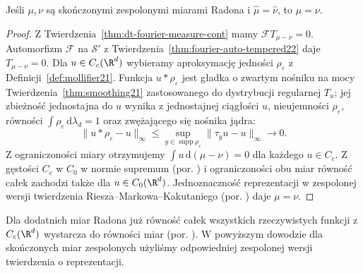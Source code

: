 \begin{twierdzenie}
\label{thm:dt-fourier-measure-unique}
Jeśli $\mu,\nu$ są skończonymi zespolonymi miarami Radona
i $\widehat\mu=\widehat\nu$, to $\mu=\nu$.
\end{twierdzenie}
\begin{proof}
Z Twierdzenia~\ref{thm:dt-fourier-measure-cont} mamy
$\mathcal FT_{\mu-\nu}=0$. Automorfizm $\mathcal F$ na
$\mathcal S'$ z Twierdzenia~\ref{thm:fourier-auto-tempered22}
daje $T_{\mu-\nu}=0$.
Dla $u\in C_c(\R^d)$ wybieramy aproksymację jedności
$\rho_\varepsilon$ z Definicji~\ref{def:mollifier21}.
Funkcja $u*\rho_\varepsilon$ jest gładka o zwartym
nośniku na mocy Twierdzenia~\ref{thm:smoothing21}
zastosowanego do dystrybucji regularnej $T_u$;
jej zbieżność jednostajna do $u$ wynika z jednostajnej
ciągłości $u$, nieujemności $\rho_\varepsilon$,
równości $\int\rho_\varepsilon\,\mathrm d\lambda_d=1$
oraz zwężającego się nośnika jądra:
\[
 \|u*\rho_\varepsilon-u\|_\infty
 \le\sup_{y\in\operatorname{supp}\rho_\varepsilon}
        \|\tau_yu-u\|_\infty\to0.
\]
Z ograniczoności miary otrzymujemy
$\int u\,\mathrm d(\mu-\nu)=0$ dla każdego $u\in C_c$.
Z gęstości $C_c$ w $C_0$ w normie supremum
(por. )
i ograniczoności obu miar równość całek zachodzi także
dla $u\in C_0(\R^d)$. Jednoznaczność reprezentacji
w zespolonej wersji twierdzenia Riesza--Markowa--Kakutaniego
(por. )
daje $\mu=\nu$.
\end{proof}

\begin{uwaga}
Dla dodatnich miar Radona już równość całek wszystkich rzeczywistych
funkcji z $C_c(\R^d)$ wystarcza do równości miar
(por. ).
W powyższym dowodzie dla skończonych miar zespolonych użyliśmy
odpowiedniej zespolonej wersji twierdzenia o reprezentacji.
\end{uwaga}

